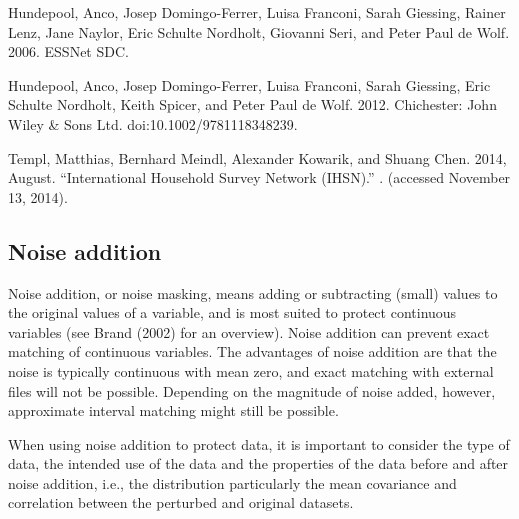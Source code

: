 \documentclass[letterpaper,10pt,english]{sphinxmanual}
\begin{document}
Hundepool, Anco, Josep Domingo-Ferrer, Luisa Franconi, Sarah Giessing,
Rainer Lenz, Jane Naylor, Eric Schulte Nordholt, Giovanni Seri, and
Peter Paul de Wolf. 2006. 
ESSNet SDC. 

Hundepool, Anco, Josep Domingo-Ferrer, Luisa Franconi, Sarah Giessing,
Eric Schulte Nordholt, Keith Spicer, and Peter Paul de Wolf. 2012.
 Chichester: John Wiley \& Sons Ltd.
doi:10.1002/9781118348239.

Templ, Matthias, Bernhard Meindl, Alexander Kowarik, and Shuang Chen.
2014, August. “International Household Survey Network (IHSN).”
. (accessed
November 13, 2014).


\subsection{Noise addition}
\label{\detokenize{anon_methods:noise-addition}}
Noise addition, or noise masking, means adding or subtracting (small)
values to the original values of a variable, and is most suited to
protect continuous variables (see Brand (2002) for an overview). Noise
addition can prevent exact matching of continuous variables. The
advantages of noise addition are that the noise is typically continuous
with mean zero, and exact matching with external files will not be
possible. Depending on the magnitude of noise added, however,
approximate interval matching might still be possible.

When using noise addition to protect data, it is important to consider
the type of data, the intended use of the data and the properties of the
data before and after noise addition, i.e., the distribution \textendash{}
particularly the mean \textendash{} covariance and correlation between the perturbed
and original datasets.
\end{document}
